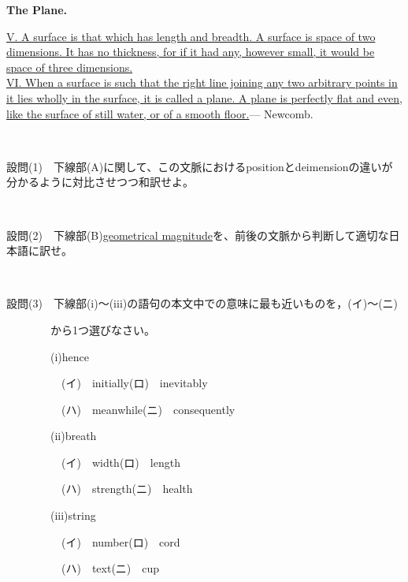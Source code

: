 \documentclass[12pt,a4paper,dvipdfmx]{jarticle}
\begin{document}
\begin{spacing}{1.5}
\vspace{2mm}

\vspace{2mm}
\begin{center}
  \textbf{The Plane.}
\end{center}

\ul{V. A surface is that which has length and breadth.
A surface is space of two dimensions. It has no thickness, for if it had any, however small,
it would be space of three dimensions.} \\

\ul{VI. When a surface is such that the right line joining any two arbitrary
points in it lies wholly in the surface, it is called a plane.
A plane is perfectly flat and even, like the surface of still water, or of a smooth floor.}—
Newcomb.
  
\

設問(1)　下線部(A)に関して、この文脈におけるpositionとdeimensionの違いが分かるように対比させつつ和訳せよ。

\

設問(2)　下線部(B)\underline{geometrical magnitude}を、前後の文脈から判断して適切な日本語に訳せ。

\


設問(3)　下線部(i)～(iii)の語句の本文中での意味に最も近いものを，(イ)～(ニ)

　　　　から1つ選びなさい。


　　　　(i)\hspace{5mm}hence

    
　　　　　(イ)　initially\hspace{22mm}(ロ)　inevitably

　　　　　(ハ)　meanwhile\hspace{17mm}(ニ)　consequently


　　　　(ii)\hspace{5mm}breath

    
　　　　　(イ)　width\hspace{25.5mm}(ロ)　length

　　　　　(ハ)　strength\hspace{21.0mm}(ニ)　health


　　　　(iii)\hspace{5mm}string

    
　　　　　(イ)　number\hspace{22.5mm}(ロ)　cord

　　　　　(ハ)　text\hspace{29.0mm}(ニ)　cup


\end{spacing}
\end{document}
